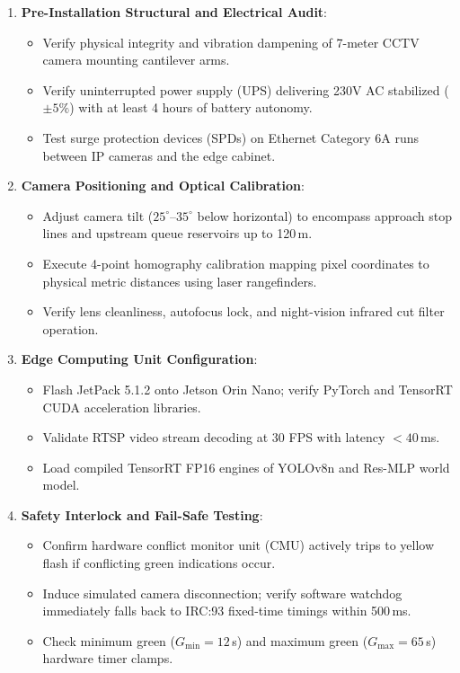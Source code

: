 \begin{enumerate}
    \item \textbf{Pre-Installation Structural and Electrical Audit}:
    \begin{itemize}
        \item[$\square$] Verify physical integrity and vibration dampening of 7-meter CCTV camera mounting cantilever arms.
        \item[$\square$] Verify uninterrupted power supply (UPS) delivering 230V AC stabilized ($\pm 5\%$) with at least 4 hours of battery autonomy.
        \item[$\square$] Test surge protection devices (SPDs) on Ethernet Category 6A runs between IP cameras and the edge cabinet.
    \end{itemize}

    \item \textbf{Camera Positioning and Optical Calibration}:
    \begin{itemize}
        \item[$\square$] Adjust camera tilt ($25^\circ \text{--} 35^\circ$ below horizontal) to encompass approach stop lines and upstream queue reservoirs up to 120\,m.
        \item[$\square$] Execute 4-point homography calibration mapping pixel coordinates to physical metric distances using laser rangefinders.
        \item[$\square$] Verify lens cleanliness, autofocus lock, and night-vision infrared cut filter operation.
    \end{itemize}

    \item \textbf{Edge Computing Unit Configuration}:
    \begin{itemize}
        \item[$\square$] Flash JetPack 5.1.2 onto Jetson Orin Nano; verify PyTorch and TensorRT CUDA acceleration libraries.
        \item[$\square$] Validate RTSP video stream decoding at 30 FPS with latency $< 40$\,ms.
        \item[$\square$] Load compiled TensorRT FP16 engines of YOLOv8n and Res-MLP world model.
    \end{itemize}

    \item \textbf{Safety Interlock and Fail-Safe Testing}:
    \begin{itemize}
        \item[$\square$] Confirm hardware conflict monitor unit (CMU) actively trips to yellow flash if conflicting green indications occur.
        \item[$\square$] Induce simulated camera disconnection; verify software watchdog immediately falls back to IRC:93 fixed-time timings within 500\,ms.
        \item[$\square$] Check minimum green ($G_{\min} = 12$\,s) and maximum green ($G_{\max} = 65$\,s) hardware timer clamps.
    \end{itemize}
\end{enumerate}
